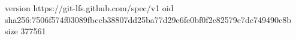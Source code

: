 version https://git-lfs.github.com/spec/v1
oid sha256:7506f574f03089fbccb38807dd25ba77d29e6fe0bf0f2c82579c7dc749490c8b
size 377561
